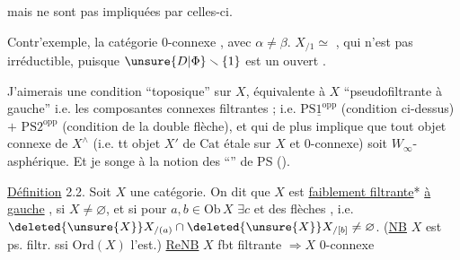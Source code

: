 mais ne sont pas impliquées par celles-ci.

Contr'exemple, la catégorie 0-connexe
, avec $\alpha\ne\beta$.   $X_{/1}\simeq$
, qui n'est pas irréductible, puisque $\unsure{D|\Phi}\smallsetminus\{1\}$  est un ouvert .

J'aimerais une condition ``toposique'' sur $X$, équivalente à  $X$ ``pseudofiltrante à gauche'' i.e. les composantes connexes filtrantes ; i.e. $\mathrm{PS}\underline{1}^{\mathrm{opp}}$ (condition \unsure{)} ci-dessus) $+$ $\mathrm{PS}2^{\mathrm{opp}}$ (condition de la double flèche), et qui de plus implique que tout objet connexe de $X^\wedge$ (i.e. tt objet $X'$ de $\mathrm{Cat}$ étale sur $X$ et 0-connexe) soit $W_\infty$-asphérique. Et je songe à la notion des ``'' de PS ().

\uline{Définition}  2.2. Soit $X$ une catégorie. 
On dit que $X$ est \uline{faiblement filtrante}*  \uline{à gauche} ,  si $X\ne\varnothing$, et si pour $a,b\in\mathrm{Ob}\,X$ $\exists c$ et des flèches
, i.e. $\deleted{\unsure{X}} X_{/(a)}\cap\deleted{\unsure{X}}X_{/[b]}\ne\varnothing$.
(\uline{NB} $X$ est ps. filtr.  ssi $\mathrm{Ord}(X)$  l'est.)
\uline{ReNB} $X$ fbt filtrante $\Longrightarrow X$ 0-connexe

